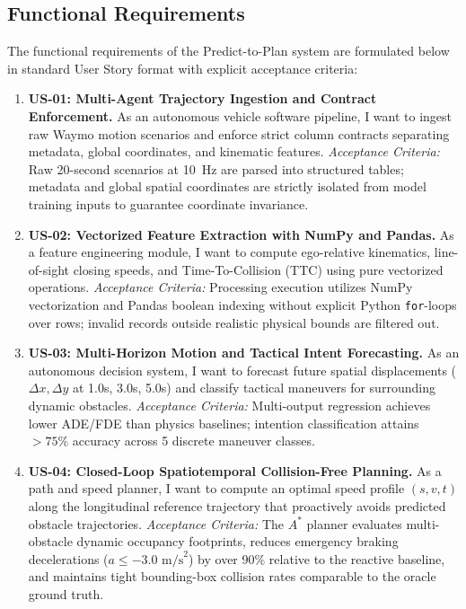 \documentclass[runningheads]{llncs}
\begin{document}
\subsection{Functional Requirements}
The functional requirements of the Predict-to-Plan system are formulated below in standard User Story format with explicit acceptance criteria:
\begin{enumerate}
    \item \textbf{US-01: Multi-Agent Trajectory Ingestion and Contract Enforcement.} As an autonomous vehicle software pipeline, I want to ingest raw Waymo motion scenarios and enforce strict column contracts separating metadata, global coordinates, and kinematic features. \textit{Acceptance Criteria:} Raw 20-second scenarios at 10~Hz are parsed into structured tables; metadata and global spatial coordinates are strictly isolated from model training inputs to guarantee coordinate invariance.
    \item \textbf{US-02: Vectorized Feature Extraction with NumPy and Pandas.} As a feature engineering module, I want to compute ego-relative kinematics, line-of-sight closing speeds, and Time-To-Collision (TTC) using pure vectorized operations. \textit{Acceptance Criteria:} Processing execution utilizes NumPy vectorization and Pandas boolean indexing without explicit Python \texttt{for}-loops over rows; invalid records outside realistic physical bounds are filtered out.
    \item \textbf{US-03: Multi-Horizon Motion and Tactical Intent Forecasting.} As an autonomous decision system, I want to forecast future spatial displacements ($\Delta x, \Delta y$ at 1.0s, 3.0s, 5.0s) and classify tactical maneuvers for surrounding dynamic obstacles. \textit{Acceptance Criteria:} Multi-output regression achieves lower ADE/FDE than physics baselines; intention classification attains $>75\%$ accuracy across 5 discrete maneuver classes.
    \item \textbf{US-04: Closed-Loop Spatiotemporal Collision-Free Planning.} As a path and speed planner, I want to compute an optimal speed profile $(s, v, t)$ along the longitudinal reference trajectory that proactively avoids predicted obstacle trajectories. \textit{Acceptance Criteria:} The $A^*$ planner evaluates multi-obstacle dynamic occupancy footprints, reduces emergency braking decelerations ($a \le -3.0\text{ m/s}^2$) by over 90\% relative to the reactive baseline, and maintains tight bounding-box collision rates comparable to the oracle ground truth.
\end{enumerate}
\end{document}
